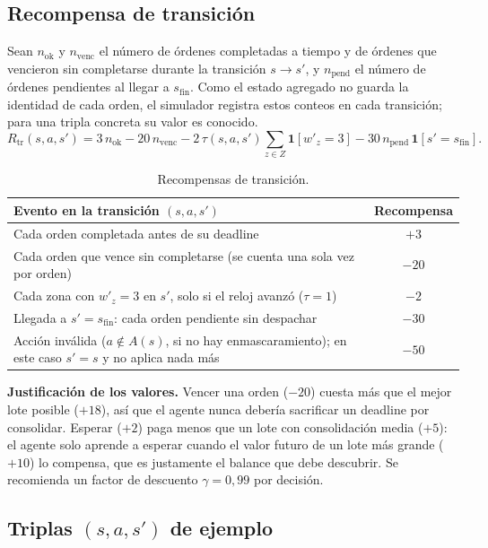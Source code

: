 \documentclass[11pt,letterpaper]{article}
\newcommand{\sfin}{s_{\mathrm{fin}}}
\begin{document}
\subsection{Recompensa de transición}

Sean $n_{\mathrm{ok}}$ y $n_{\mathrm{venc}}$ el número de órdenes completadas a tiempo y de órdenes
que vencieron sin completarse durante la transición $s \to s'$, y $n_{\mathrm{pend}}$ el número
de órdenes pendientes al llegar a $\sfin$. Como el estado agregado no guarda la identidad de cada
orden, el simulador registra estos conteos en cada transición; para una tripla concreta su valor es conocido.
\[
  R_{\mathrm{tr}}(s,a,s') = 3\,n_{\mathrm{ok}} - 20\,n_{\mathrm{venc}}
   - 2\,\tau(s,a,s')\sum_{z\in Z}\mathbf{1}[w'_z = 3]
   - 30\,n_{\mathrm{pend}}\,\mathbf{1}[s'=\sfin].
\]

\begin{table}[h]
\centering\small
\begin{tabularx}{\textwidth}{@{}Lc@{}}
\toprule
\textbf{Evento en la transición $(s,a,s')$} & \textbf{Recompensa} \\
\midrule
Cada orden completada antes de su deadline & $+3$ \\
Cada orden que vence sin completarse (se cuenta una sola vez por orden) & $-20$ \\
Cada zona con $w'_z = 3$ en $s'$, solo si el reloj avanzó ($\tau=1$) & $-2$ \\
Llegada a $s'=\sfin$: cada orden pendiente sin despachar & $-30$ \\
Acción inválida ($a\notin A(s)$, si no hay enmascaramiento); en este caso $s'=s$ y no aplica nada más & $-50$ \\
\bottomrule
\end{tabularx}
\caption{Recompensas de transición.}
\end{table}

\textbf{Justificación de los valores.} Vencer una orden ($-20$) cuesta más que el mejor lote posible
($+18$), así que el agente nunca debería sacrificar un deadline por consolidar. Esperar ($+2$) paga
menos que un lote con consolidación media ($+5$): el agente solo aprende a esperar cuando el valor
futuro de un lote más grande ($+10$) lo compensa, que es justamente el balance que debe descubrir.
Se recomienda un factor de descuento $\gamma = 0{,}99$ por decisión.

\subsection{Triplas \texorpdfstring{$(s,a,s')$}{(s,a,s')} de ejemplo}
\end{document}
